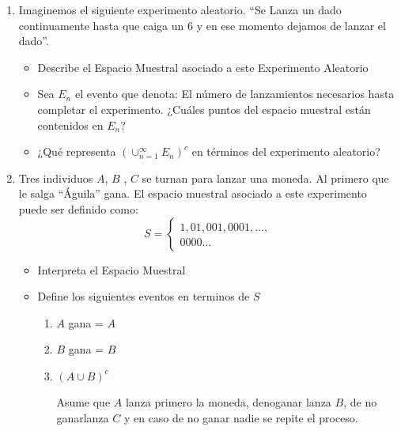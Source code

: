 \documentclass[11pt,letterpaper]{report}
\begin{document}
\begin{enumerate}

\item Imaginemos el siguiente experimento aleatorio. ``Se Lanza un dado continuamente hasta que
caiga un 6 y en ese momento dejamos de lanzar el dado''.

\begin{itemize}
    \item Describe el Espacio Muestral asociado a este Experimento Aleatorio
    

    \item Sea $E_n$ el evento que denota: El número de lanzamientos necesarios hasta completar el
    experimento. ¿Cuáles puntos del espacio muestral están contenidos en $E_n$?


    \item ¿Qué representa $(\cup_{n=1}^{\infty} E_n)^c$ en términos del experimento aleatorio?
    
    
\end{itemize}
    
    
\item Tres individuos $A$, $B$ , $C$ se turnan para lanzar una moneda. Al primero que le salga
``Águila'' gana. El espacio muestral asociado a este experimento puede ser definido como:
\[
    S =
    \begin{cases}
        1, 01, 001, 0001, \ldots,\\
        0000\ldots
    \end{cases}
\]

\begin{itemize}
    \item Interpreta el Espacio Muestral
    \item Define los siguientes eventos en terminos de $S$

    \begin{enumerate}[label=\alph*)]
        \item $A$ gana = $A$
        \item $B$ gana = $B$
        \item $(A \cup B)^c$
        
        Asume que $A$ lanza primero la moneda, denoganar lanza $B$, de no ganarlanza $C$ y en
        caso de no ganar nadie se repite el proceso.    
    \end{enumerate}

\end{itemize}


\end{enumerate}
\end{document}
